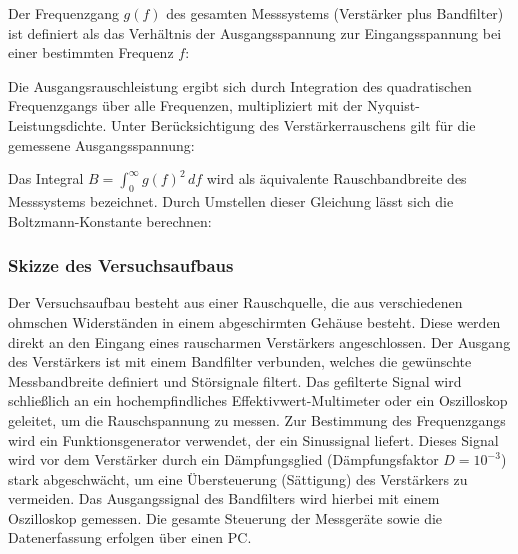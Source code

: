 Der Frequenzgang $g(f)$ des gesamten Messsystems (Verstärker plus Bandfilter) ist definiert als das Verhältnis der Ausgangsspannung zur Eingangsspannung bei einer bestimmten Frequenz $f$:


Die Ausgangsrauschleistung ergibt sich durch Integration des quadratischen Frequenzgangs über alle Frequenzen, multipliziert mit der Nyquist-Leistungsdichte. Unter Berücksichtigung des Verstärkerrauschens gilt für die gemessene Ausgangsspannung:


Das Integral $B = \int_0^\infty g(f)^2 \, df$ wird als äquivalente Rauschbandbreite des Messsystems bezeichnet. Durch Umstellen dieser Gleichung lässt sich die Boltzmann-Konstante berechnen:


\subsubsection*{Skizze des Versuchsaufbaus}
\label{sec:Skizze}

Der Versuchsaufbau besteht aus einer Rauschquelle, die aus verschiedenen ohmschen Widerständen in einem abgeschirmten Gehäuse besteht. Diese werden direkt an den Eingang eines rauscharmen Verstärkers angeschlossen. Der Ausgang des Verstärkers ist mit einem Bandfilter verbunden, welches die gewünschte Messbandbreite definiert und Störsignale filtert. Das gefilterte Signal wird schließlich an ein hochempfindliches Effektivwert-Multimeter oder ein Oszilloskop geleitet, um die Rauschspannung zu messen. Zur Bestimmung des Frequenzgangs wird ein Funktionsgenerator verwendet, der ein Sinussignal liefert. Dieses Signal wird vor dem Verstärker durch ein Dämpfungsglied (Dämpfungsfaktor $D = 10^{-3}$) stark abgeschwächt, um eine Übersteuerung (Sättigung) des Verstärkers zu vermeiden. Das Ausgangssignal des Bandfilters wird hierbei mit einem Oszilloskop gemessen. Die gesamte Steuerung der Messgeräte sowie die Datenerfassung erfolgen über einen PC.

